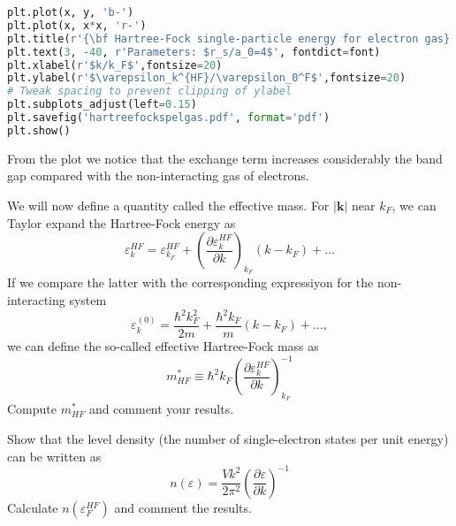 \documentclass[graybox,sectrefs,envcountresetchap,open=right]{svmonodo}
\newenvironment{doconceexercise}{}{}
\begin{document}
\begin{doconceexercise}
\begin{lstlisting}[language=Python,style=blue1]
plt.plot(x, y, 'b-')
plt.plot(x, x*x, 'r-')
plt.title(r'{\bf Hartree-Fock single-particle energy for electron gas}', fontsize=20)     
plt.text(3, -40, r'Parameters: $r_s/a_0=4$', fontdict=font)
plt.xlabel(r'$k/k_F$',fontsize=20)
plt.ylabel(r'$\varepsilon_k^{HF}/\varepsilon_0^F$',fontsize=20)
# Tweak spacing to prevent clipping of ylabel
plt.subplots_adjust(left=0.15)
plt.savefig('hartreefockspelgas.pdf', format='pdf')
plt.show()
\end{lstlisting}
From the plot we notice that the exchange term increases considerably the band gap
compared with the non-interacting gas of electrons.

We will now define a quantity called the effective mass.
For $\vert\mathbf{k}\vert$ near $k_{F}$, we can Taylor expand the Hartree-Fock energy as  
\[
\varepsilon_{k}^{HF}=\varepsilon_{k_{F}}^{HF}+
\left(\frac{\partial\varepsilon_{k}^{HF}}{\partial k}\right)_{k_{F}}(k-k_{F})+\dots
\]
If we compare the latter with the corresponding expressiyon for the non-interacting system
\[
\varepsilon_{k}^{(0)}=\frac{\hbar^{2}k^{2}_{F}}{2m}+
\frac{\hbar^{2}k_{F}}{m}\left(k-k_{F}\right)+\dots ,
\]
we can define the so-called effective Hartree-Fock mass as
\[
m_{HF}^{*}\equiv\hbar^{2}k_{F}\left(
\frac{\partial\varepsilon_{k}^{HF}}
{\partial k}\right)_{k_{F}}^{-1}
\]
Compute $m_{HF}^{*}$ and comment your results.

Show that the level density (the number of single-electron states per unit energy) can be written as
\[
n(\varepsilon)=\frac{Vk^{2}}{2\pi^{2}}\left(
\frac{\partial\varepsilon}{\partial k}\right)^{-1}
\]
Calculate $n(\varepsilon_{F}^{HF})$ and comment the results.




\end{doconceexercise}
\end{document}
